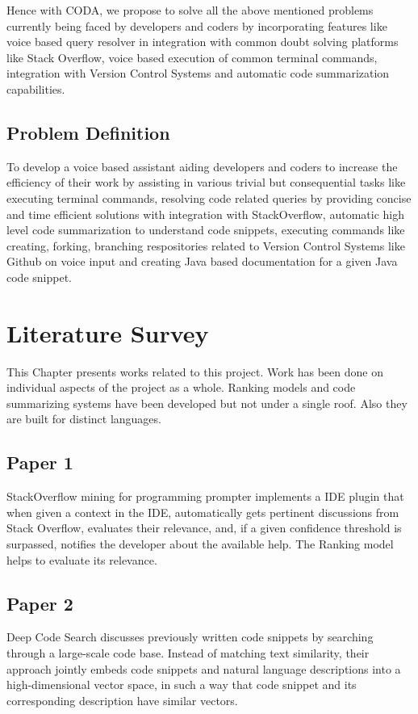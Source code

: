 \documentclass[oneside,a4paper,12pt, times]{book}
\begin{document}
Hence with CODA, we propose to solve all the above mentioned problems currently being faced by developers and coders by incorporating features like voice based query resolver in integration with common doubt solving platforms like Stack Overflow, voice based execution of common terminal commands, integration with Version Control Systems and automatic code summarization capabilities. 
\section{Problem Definition}
\label{sec:problem}
        To develop a voice based assistant aiding developers and coders to increase the efficiency of their work by assisting in various trivial but consequential tasks like executing terminal commands, resolving code related queries by providing concise and time efficient solutions with integration with StackOverflow, automatic high level code summarization to understand code snippets, executing commands like creating, forking, branching respositories related to Version Control Systems like Github on voice input and creating Java based documentation for a given Java code snippet.    

\chapter{Literature Survey}
This Chapter presents works related to this project. Work has been done on individual aspects of the project as a whole. Ranking models and code summarizing systems have been developed but not under a single roof. Also they are built for distinct languages. 
\section{Paper 1}
StackOverflow mining for programming prompter\cite{monperrus} implements a IDE plugin that when given a context in the IDE, automatically gets pertinent discussions from Stack Overflow, evaluates their relevance, and, if a given confidence threshold is surpassed, notifies the developer about the available help. The Ranking model helps to evaluate its relevance.
\section{Paper 2}
Deep Code Search\cite{gu2018deep} discusses previously written code snippets by searching through a large-scale code base. Instead of matching text similarity, their approach jointly embeds code snippets and natural language descriptions into a high-dimensional vector space, in such a way that code snippet and its corresponding description have similar vectors.
\end{document}
